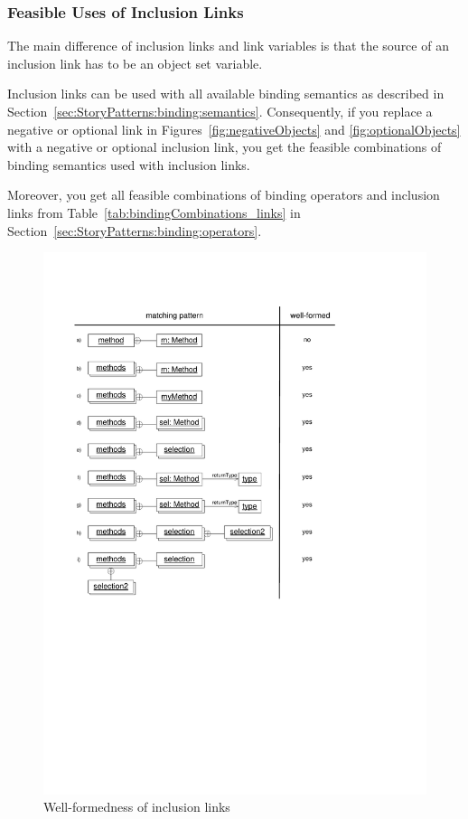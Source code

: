 \subsubsection{Feasible Uses of Inclusion Links}
\label{sec:StoryPatterns:inclusion:feasible}

The main difference of inclusion links and link variables is that the source of an inclusion link has to be an object set variable.

Inclusion links can be used with all available binding semantics as described in Section~\ref{sec:StoryPatterns:binding:semantics}.
Consequently, if you replace a negative or optional link in Figures~\ref{fig:negativeObjects} and \ref{fig:optionalObjects}
with a negative or optional inclusion link, you get the feasible combinations of binding semantics used with inclusion links.

Moreover, you get all feasible combinations of binding operators and inclusion links from
Table~\ref{tab:bindingCombinations_links} in Section~\ref{sec:StoryPatterns:binding:operators}.

\begin{figure}[htb]
  \centering
  \includegraphics[scale=0.8]{figures/InclusionLinksWellFormedness}
  \caption{Well-formedness of inclusion links}
  \label{fig:InlucionLinkWellFormedness}
\end{figure}

